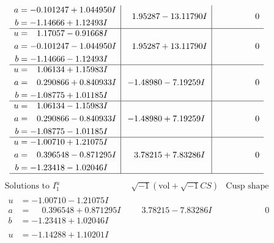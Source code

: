 \documentclass[1p]{elsarticle_modified}
\theoremstyle{definition}
\newcommand{\I}{\sqrt{-1}}
\begin{document}
$$\begin{array}{c|c|c}
\begin{aligned}
a &= -0.101247 + 1.044950 I \\
b &= -1.14666 + 1.12493 I\end{aligned}
 & \phantom{-}1.95287 - 13.11790 I & \phantom{-0.000000 } 0 \\ \hline\begin{aligned}
u &= \phantom{-}1.17057 - 0.91668 I \\
a &= -0.101247 - 1.044950 I \\
b &= -1.14666 - 1.12493 I\end{aligned}
 & \phantom{-}1.95287 + 13.11790 I & \phantom{-0.000000 } 0 \\ \hline\begin{aligned}
u &= \phantom{-}1.06134 + 1.15983 I \\
a &= \phantom{-}0.290866 + 0.840933 I \\
b &= -1.08775 + 1.01185 I\end{aligned}
 & -1.48980 - 7.19259 I & \phantom{-0.000000 } 0 \\ \hline\begin{aligned}
u &= \phantom{-}1.06134 - 1.15983 I \\
a &= \phantom{-}0.290866 - 0.840933 I \\
b &= -1.08775 - 1.01185 I\end{aligned}
 & -1.48980 + 7.19259 I & \phantom{-0.000000 } 0 \\ \hline\begin{aligned}
u &= -1.00710 + 1.21075 I \\
a &= \phantom{-}0.396548 - 0.871295 I \\
b &= -1.23418 - 1.02046 I\end{aligned}
 & \phantom{-}3.78215 + 7.83286 I & \phantom{-0.000000 } 0\\
 \hline 
 \end{array}$$\newpage$$\begin{array}{c|c|c}  
\text{Solutions to }I^u_{1}& \I (\text{vol} + \sqrt{-1}CS) & \text{Cusp shape}\\
 \hline 
\begin{aligned}
u &= -1.00710 - 1.21075 I \\
a &= \phantom{-}0.396548 + 0.871295 I \\
b &= -1.23418 + 1.02046 I\end{aligned}
 & \phantom{-}3.78215 - 7.83286 I & \phantom{-0.000000 } 0 \\ \hline\begin{aligned}
u &= -1.14288 + 1.10201 I \\

\end{aligned}
\end{array}$$
\end{document}
